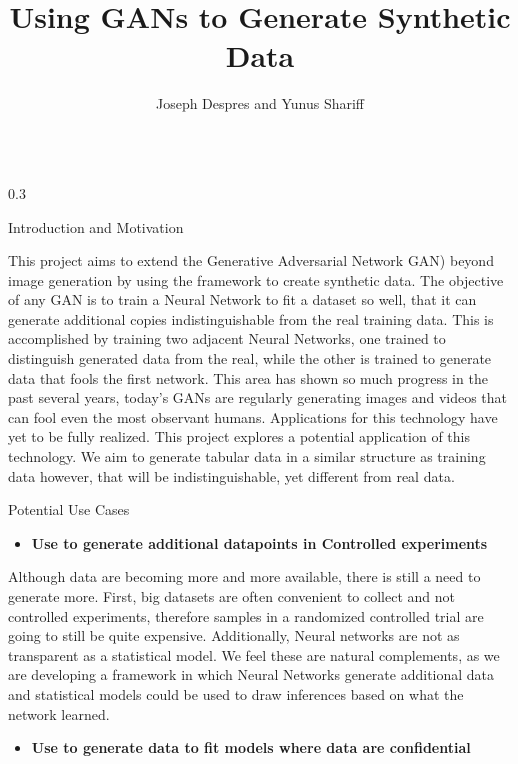 \documentclass{msuposter}
\title{Using GANs to Generate Synthetic Data}
\author{Joseph Despres and Yunus Shariff}
\institute{Michigan State University}
\newcommand{\colwidth}{0.3\linewidth}
\begin{document}
\begin{frame}{}
\begin{columns}[t]

\begin{column}{\colwidth}

\begin{block}{Introduction and Motivation}

This project aims to extend the Generative Adversarial Network GAN) beyond image generation by using the framework to create synthetic data. The objective of any GAN is to train a Neural Network to fit a dataset so well, that it can generate additional copies indistinguishable from the real training data. This is accomplished by training two adjacent Neural Networks, one trained to distinguish generated data from the real, while the other is trained to generate data that fools the first network\cite{NIPS2014_5ca3e9b1}. This area has shown so much progress in the past several years, today's GANs are regularly generating images and videos that can fool even the most observant humans. Applications for this technology have yet to be fully realized. This project explores a potential application of this technology. We aim to generate tabular data in a similar structure as training data however, that will be indistinguishable, yet different from real data. 

\end{block}

\begin{block}{Potential Use Cases}

\begin{itemize}
	\item \textbf{Use to generate additional datapoints in Controlled experiments}
\end{itemize}


Although data are becoming more and more available, there is still a need to generate more. First, big datasets are often convenient to collect and not controlled experiments, therefore samples in a randomized controlled trial are going to still be quite expensive. Additionally, Neural networks are not as transparent as a statistical model. We feel these are natural complements, as we are developing a framework in which Neural Networks generate additional data and statistical models could be used to draw inferences based on what the network learned.

\begin{itemize}
	\item \textbf{Use to generate data to fit models where data are confidential}
\end{itemize}


\end{block}
\end{column}
\end{columns}
\end{frame}
\end{document}
